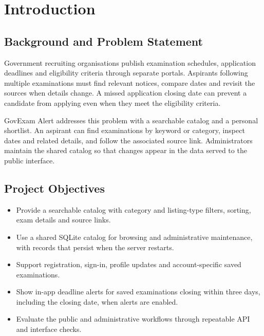 \documentclass[12pt,a4paper]{report}
\begin{document}
\clearpage{\small\setlength{\parskip}{0pt}\tableofcontents}\clearpage{}

\chapter{Introduction}

\section{Background and Problem Statement}

Government recruiting organisations publish examination schedules, application deadlines and eligibility criteria through separate portals. Aspirants following multiple examinations must find relevant notices, compare dates and revisit the sources when details change. A missed application closing date can prevent a candidate from applying even when they meet the eligibility criteria.


GovExam Alert addresses this problem with a searchable catalog and a personal shortlist. An aspirant can find examinations by keyword or category, inspect dates and related details, and follow the associated source link. Administrators maintain the shared catalog so that changes appear in the data served to the public interface.


\section{Project Objectives}

\begin{itemize}
\item Provide a searchable catalog with category and listing-type filters, sorting, exam details and source links.
\item Use a shared SQLite catalog for browsing and administrative maintenance, with records that persist when the server restarts.
\item Support registration, sign-in, profile updates and account-specific saved examinations.
\item Show in-app deadline alerts for saved examinations closing within three days, including the closing date, when alerts are enabled.
\item Evaluate the public and administrative workflows through repeatable API and interface checks.
\end{itemize}

\clearpage
\end{document}
